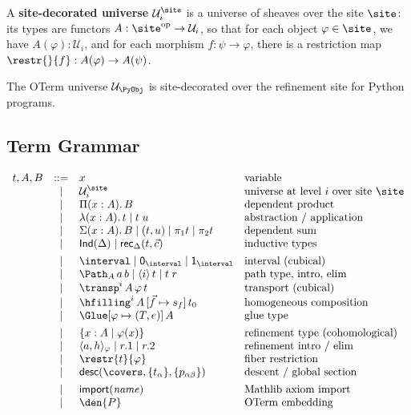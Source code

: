 \begin{definition}
A \textbf{site-decorated universe} \(\mathcal{U}_i^{\site}\) is a
universe of sheaves over the site \(\site\): its types are functors
\(A : \site^{\mathrm{op}} \to \mathcal{U}_i\), so that for each object
\(\varphi \in \site\), we have \(A(\varphi) : \mathcal{U}_i\), and
for each morphism \(f : \psi \to \varphi\), there is a restriction
map \(\restr{}{f} : A(\varphi) \to A(\psi)\).
\end{definition}

The OTerm universe \(\mathcal{U}_\PyObj\) is site-decorated over
the refinement site for Python programs.

\subsection{Term Grammar}

\[
\begin{array}{rcll}
  t, A, B & ::= & x & \text{variable} \\
  & \mid & \mathcal{U}_i^{\site} & \text{universe at level \(i\) over site \(\site\)} \\
  & \mid & \Pi(x : A).\, B & \text{dependent product} \\
  & \mid & \lambda(x : A).\, t \mid t\; u & \text{abstraction / application} \\
  & \mid & \Sigma(x : A).\, B \mid (t, u) \mid \pi_1 t \mid \pi_2 t
    & \text{dependent sum} \\
  & \mid & \mathsf{Ind}(\Delta) \mid \mathsf{rec}_\Delta(t, \vec{c})
    & \text{inductive types} \\[4pt]
  & \mid & \interval \mid \mathsf{0}_\interval \mid \mathsf{1}_\interval
    & \text{interval (cubical)} \\
  & \mid & \Path_A\, a\, b \mid \langle i \rangle\, t \mid t\; r
    & \text{path type, intro, elim} \\
  & \mid & \transp^i\, A\, \varphi\, t
    & \text{transport (cubical)} \\
  & \mid & \hfilling^i\, A\, [\vec{f} \mapsto s_f]\, t_0
    & \text{homogeneous composition} \\
  & \mid & \Glue[\varphi \mapsto (T, e)]\, A
    & \text{glue type} \\[4pt]
  & \mid & \{x : A \mid \varphi(x)\}
    & \text{refinement type (cohomological)} \\
  & \mid & \langle a, h \rangle_\varphi \mid r.1 \mid r.2
    & \text{refinement intro / elim} \\
  & \mid & \restr{t}{\varphi}
    & \text{fiber restriction} \\
  & \mid & \mathsf{desc}(\covers, \{t_\alpha\}, \{p_{\alpha\beta}\})
    & \text{descent / global section} \\[4pt]
  & \mid & \mathsf{import}(\mathit{name})
    & \text{Mathlib axiom import} \\
  & \mid & \den{P}
    & \text{OTerm embedding} \\
\end{array}
\]


